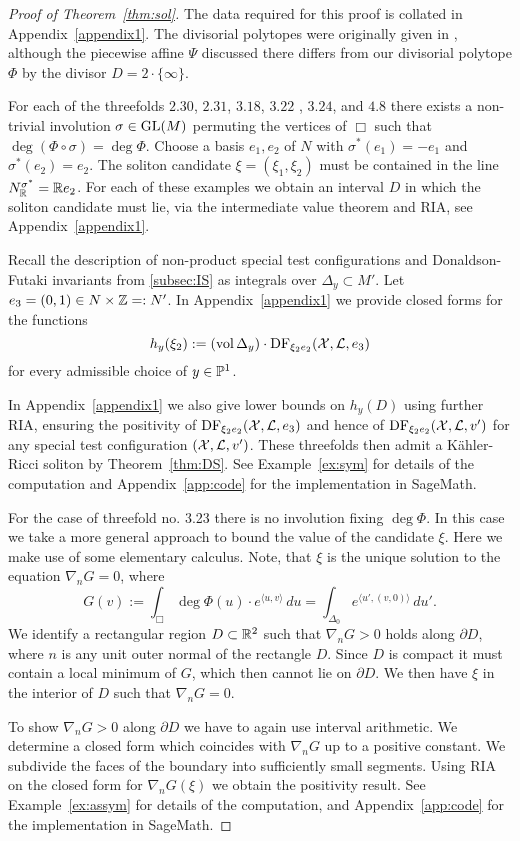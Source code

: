 \begin{proof}[Proof of Theorem~\ref{thm:sol}]
The data required for this proof is collated in Appendix~\ref{appendix1}. The divisorial polytopes were originally given in \cite{suss2013fano}, although the piecewise affine \(\Psi\) discussed there differs from our divisorial polytope \(\Phi\) by the divisor \(D = 2 \cdot \{ \infty \}\).

For each of the threefolds \(2.30\), \(2.31\), \(3.18\), \(3.22\) , \(3.24\), and \(4.8\) there exists a non-trivial involution \(\sigma \in \operatorname{GL}(M)\) permuting the vertices of \(\Box\) such that \(\deg (\Phi \circ \sigma) = \deg \Phi\). Choose a basis $e_1, e_2$ of $N$ with $\sigma^*(e_1)=-e_1$ and $\sigma^*(e_2)=e_2$. The soliton candidate $\xi = (\xi_1,\xi_2)$ must be contained in the line $N_{\mathbb{R}}^{\sigma^*} = \mathbb{R} e_2$. For each of these examples we obtain an interval \(D\) in which the soliton candidate must lie, via the intermediate value theorem and RIA, see Appendix~\ref{appendix1}.

Recall the description of non-product special test configurations and Donaldson-Futaki invariants from \ref{subsec:IS} as integrals over \(\Delta_y \subset M'\). Let \(e_3 = (0,1) \in N \times \mathbb{Z} =: N'\). In Appendix~\ref{appendix1} we provide closed forms for the functions
\[
h_y(\xi_2) := (\mathop{\rm vol}\nolimits \Delta_y) \cdot \mathop{\rm DF}\nolimits_{\xi_2 e_2}({\mathcal{X}},\mathcal{L},e_3)
\] for every admissible choice of $y \in \mathbb{P}^1$.

In Appendix~\ref{appendix1} we also give lower bounds on \(h_y(D)\) using further RIA, ensuring the positivity of $\mathop{\rm DF}\nolimits_{\xi_2 e_2}({\mathcal{X}},\mathcal{L},e_3)$ and hence of $\mathop{\rm DF}\nolimits_{\xi_2 e_2}({\mathcal{X}},\mathcal{L},v')$ for any special test configuration \(({\mathcal{X}},\mathcal{L},v')\). These threefolds then admit a K\"ahler-Ricci soliton by Theorem~\ref{thm:DS}. See Example~\ref{ex:sym} for details of the computation and Appendix~\ref{app:code} for the implementation in SageMath.

For the case of threefold no. 3.23 there is no involution fixing $\deg \Phi$. In this case we take a more general approach to bound the value of the candidate \(\xi\). Here we make use of some elementary calculus. Note, that \(\xi\) is the unique solution to the equation \(\nabla_n G = 0 \), where 
\[
G(v) := \int_{\Box} \deg \Phi(u) \cdot e^{\langle u, v \rangle}\, du = 
\int_{\Delta_0} e^{\langle u', (v,0) \rangle} \, du'.
\]
We identify a rectangular region \(D \subset \mathbb{R}^2 \) such that \(\nabla_n G > 0 \) holds along \(\partial D\), where \(n\) is any unit outer normal of the rectangle \(D\). Since $D$ is compact it must contain a local minimum of $G$, which then cannot lie on \(\partial D\). We then have \(\xi\) in the interior of \(D\) such that \(\nabla_n G = 0\).

To show $\nabla_n G >0 $ along $\partial D$ we have to again use interval arithmetic. We determine a closed form which coincides with $\nabla_n G$ up to a positive constant. We subdivide the faces of the boundary into sufficiently small segments. Using RIA on the closed form for $\nabla_n G(\xi)$ we obtain the positivity result. See Example~\ref{ex:assym} for details of the computation, and Appendix~\ref{app:code} for the implementation in SageMath.
\end{proof}
\newpage
